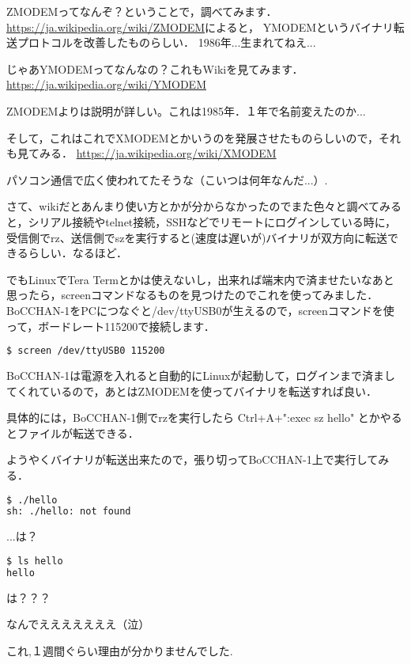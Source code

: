 ZMODEMってなんぞ？ということで，調べてみます．
\url{https://ja.wikipedia.org/wiki/ZMODEM}によると，
YMODEMというバイナリ転送プロトコルを改善したものらしい．
1986年...生まれてねえ...

じゃあYMODEMってなんなの？これもWikiを見てみます．
\url{https://ja.wikipedia.org/wiki/YMODEM}

ZMODEMよりは説明が詳しい。これは1985年．１年で名前変えたのか...

そして，これはこれでXMODEMとかいうのを発展させたものらしいので，それも見てみる．
\url{https://ja.wikipedia.org/wiki/XMODEM}

パソコン通信で広く使われてたそうな（こいつは何年なんだ...）.

さて、wikiだとあんまり使い方とかが分からなかったのでまた色々と調べてみると，シリアル接続やtelnet接続，SSHなどでリモートにログインしている時に，受信側でrz、送信側でszを実行すると(速度は遅いが)バイナリが双方向に転送できるらしい．なるほど．

でもLinuxでTera Termとかは使えないし，出来れば端末内で済ませたいなあと思ったら，screenコマンドなるものを見つけたのでこれを使ってみました．
BoCCHAN-1をPCにつなぐと/dev/ttyUSB0が生えるので，screenコマンドを使って，ボードレート115200で接続します．

\newpage


\begin{lstlisting}[language=bash,caption=screenコマンドで/dev/ttyUSB0にボードレート115200で接続]
$ screen /dev/ttyUSB0 115200
\end{lstlisting}

BoCCHAN-1は電源を入れると自動的にLinuxが起動して，ログインまで済ましてくれているので，あとはZMODEMを使ってバイナリを転送すれば良い．

具体的には，BoCCHAN-1側でrzを実行したら
Ctrl+A+":exec sz hello"
とかやるとファイルが転送できる．

ようやくバイナリが転送出来たので，張り切ってBoCCHAN-1上で実行してみる．

\begin{lstlisting}[language=sh]
$ ./hello
sh: ./hello: not found
\end{lstlisting}

...は？

\begin{lstlisting}[language=sh]
$ ls hello
hello
\end{lstlisting}

は？？？

なんでえええええええ（泣）

これ,１週間ぐらい理由が分かりませんでした.

